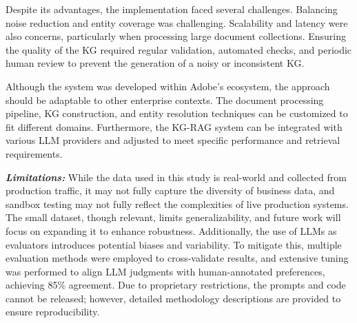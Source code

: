 Despite its advantages, the implementation faced several challenges. Balancing noise reduction and entity coverage was challenging. Scalability and latency were also concerns, particularly when processing large document collections. Ensuring the quality of the KG required regular validation, automated checks, and periodic human review to prevent the generation of a noisy or inconsistent KG.
\begin{table}[htbp]
\centering
{}

\caption{Comparison of response relevance between baseline and KG-RAG systems. The baseline system retrieves the top documents based on the cosine similarity of embeddings and provides those documents, along with a prompt, to the LLM to generate the final answer.}
\vspace{-3.75em}
\label{tab:results}
\end{table}

Although the system was developed within Adobe's ecosystem, the approach should be adaptable to other enterprise contexts. The document processing pipeline, KG construction, and entity resolution techniques can be customized to fit different domains. Furthermore, the KG-RAG system can be integrated with various LLM providers and adjusted to meet specific performance and retrieval requirements.



\textit{\textbf{Limitations:}}  
While the data used in this study is real-world and collected from production traffic, it may not fully capture the diversity of business data, and sandbox testing may not fully reflect the complexities of live production systems. The small dataset, though relevant, limits generalizability, and future work will focus on expanding it to enhance robustness. Additionally, the use of LLMs as evaluators introduces potential biases and variability. To mitigate this, multiple evaluation methods were employed to cross-validate results, and extensive tuning was performed to align LLM judgments with human-annotated preferences, achieving 85\% agreement. Due to proprietary restrictions, the prompts and code cannot be released; however, detailed methodology descriptions are provided to ensure reproducibility.


